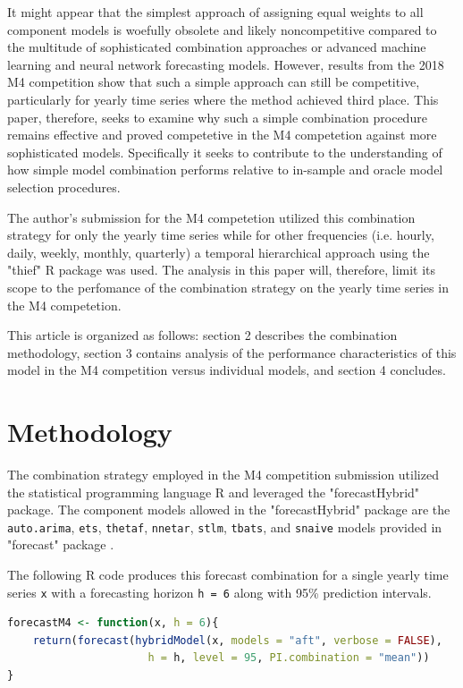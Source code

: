 \documentclass[11pt,3p,review,authoryear]{elsarticle}
\begin{document}
It might appear that the simplest approach of assigning equal weights to all component models is woefully obsolete and likely noncompetitive compared to the multitude of sophisticated combination approaches or advanced machine learning and neural network forecasting models. However, results from the 2018 M4 competition \citep{M4} show that such a simple approach can still be competitive, particularly for yearly time series where the method achieved third place. This paper, therefore, seeks to examine why such a simple combination procedure remains effective and proved competetive in the M4 competetion against more sophisticated models. Specifically it seeks to contribute to the understanding of how simple model combination performs relative to in-sample and oracle model selection procedures.


The author's submission for the M4 competetion utilized this combination strategy for only the yearly time series while for other frequencies (i.e. hourly, daily, weekly, monthly, quarterly) a temporal hierarchical approach using the "thief" R package \citep{ATHANASOPOULOS201760} was used. The analysis in this paper will, therefore, limit its scope to the perfomance of the combination strategy on the yearly time series in the M4 competetion.


This article is organized as follows: section 2 describes the combination methodology, section 3 contains analysis of the performance characteristics of this model in the M4 competition versus individual models, and section 4 concludes.


\section{Methodology}
The combination strategy employed in the M4 competition submission utilized the statistical programming language R \citep{Rlang} and leveraged the "forecastHybrid" \citep{forecastHybrid} package. The component models allowed in the "forecastHybrid" package are the  \lstinline{auto.arima}, \lstinline{ets}, \lstinline{thetaf}, \lstinline{nnetar}, \lstinline{stlm}, \lstinline{tbats}, and \lstinline{snaive} models provided in "forecast" package \citep{Forecast}.


The following R code produces this forecast combination for a single yearly time series \lstinline{x} with a forecasting horizon \lstinline{h = 6} along with 95\% prediction intervals.
\begin{lstlisting}[language=R]
forecastM4 <- function(x, h = 6){
    return(forecast(hybridModel(x, models = "aft", verbose = FALSE),
                      h = h, level = 95, PI.combination = "mean"))
}
\end{lstlisting}
\end{document}
